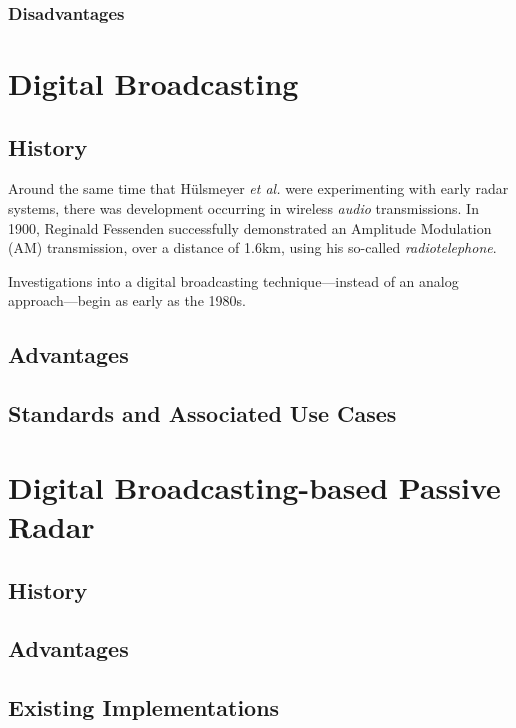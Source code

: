 \documentclass[class=report,11pt,crop=false]{standalone}
\begin{document}
\subsubsection{Disadvantages}

\section{Digital Broadcasting}
\subsection{History}
Around the same time that H\"ulsmeyer \emph{et al.} were experimenting with early radar systems, there was development occurring in wireless \emph{audio} transmissions. In 1900, Reginald Fessenden successfully demonstrated an Amplitude Modulation (AM) transmission, over a distance of 1.6km, using his so-called \emph{radiotelephone}. 

Investigations into a digital broadcasting technique---instead of an analog approach---begin as early as the 1980s.

\subsection{Advantages}
\subsection{Standards and Associated Use Cases}


\section{Digital Broadcasting-based Passive Radar}
\subsection{History}
\subsection{Advantages}
\subsection{Existing Implementations}




\ifstandalone

\fi
\end{document}
